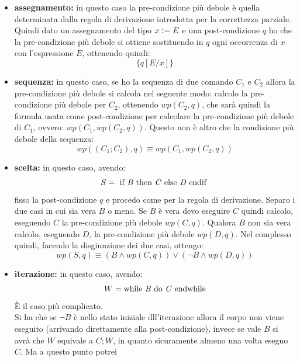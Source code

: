 				      				\begin{itemize}
				      					\item \textbf{assegnamento:} in questo caso la pre-condizione più debole è
				      					      quella determinata dalla regola di derivazione introdotta per la correttezza
				      					      parziale. Quindi dato un assegnamento del tipo $x\cceq E$ e una post-condizione
				      					      $q$ ho che la pre-condizione più debole si ottiene sostituendo in $q$ ogni
				      					      occorrenza di $x$ con l'espressione $E$, ottenendo quindi:
				      					      \[\{q[E/x]\}\]
				      					\item \textbf{sequenza:} in questo caso, se ho la sequenza di due comando
				      					      $C_1$ e $C_2$ allora la pre-condizione più debole si calcola nel seguente modo:
				      					      calcolo la pre-condizione più debole per $C_2$, ottenendo $wp(C_2,q)$, che sarà
				      					      quindi la formula usata come post-condizione per calcolare la pre-condizione più
				      					      debole di $C_1$, ovvero: $wp(C_1,wp(C_2,q))$. Questo non è altro che la
				      					      condizione più debole della sequenza:
				      					      \[wp((C_1;C_2),q)\equiv wp(C_1,wp(C_2,q))\]
				      					\item \textbf{scelta:} in questo caso, avendo:
				      					      \[S=\mbox{ if \textit{B} then \textit{C} else \textit{D} endif }\]
				      					      fisso la post-condizione $q$ e procedo come per la regola di
				      					      derivazione. Separo i due casi in cui sia vera $B$ o meno. Se $B$ è vera devo
				      					      eseguire $C$ quindi calcolo, eseguendo $C$ la pre-condizione più debole
				      					      $wp(C,q)$. Qualora $B$ non sia vera calcolo, eseguendo $D$, la pre-condizione
				      					      più debole $wp(D,q)$. Nel complesso quindi, facendo la disgiunzione dei due
				      					      casi, ottengo: 
				      					      \[wp(S,q)\equiv(B\land wp(C,q))\lor (\neg B\land wp(D,q))\]
				      					\item \textbf{iterazione:} in questo caso, avendo:
				      					      \[W=\mbox{while \textit{B} do \textit{C} endwhile}\]
				      					      È il caso più complicato.\\
				      					      Si ha che se $\neg B$ è nello stato iniziale dll'iterazione allora il corpo
				      					      non viene eseguito (arrivando direttamente alla post-condizione), invece se
				      					      vale $B$ si avrà che $W$ equivale a $C;W$, in 
				      					      quanto sicuramente almeno una volta eseguo $C$. Ma a questo punto potrei

\end{itemize}

